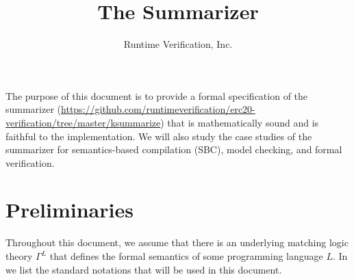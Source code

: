 \documentclass{article}
\title{The \K Summarizer}
\author{Runtime Verification, Inc.}
\begin{document}
\maketitle

The purpose of this document is to provide a formal specification of
the \K summarizer (\url{https://github.com/runtimeverification/erc20-verification/tree/master/ksummarize})
that is mathematically sound
and is faithful to the implementation.
We will also study the case studies 
of the summarizer for semantics-based compilation (SBC),
model checking, and formal verification. 


\section{Preliminaries}

Throughout this document, we assume that there is an 
underlying matching logic theory $\Gamma^L$ that defines the formal semantics
of some programming language $L$. 
In  we list the standard notations that will be used
in this document.
\end{document}
